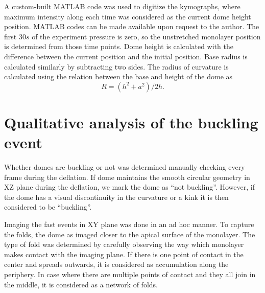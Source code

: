 A custom-built MATLAB code was used to digitize the kymographs, where maximum intensity along each time was considered as the current dome height position. MATLAB codes can be made available upon request to the author. The first $30 s$ of the experiment pressure is zero, so the unstretched monolayer position is determined from those time points. Dome height is calculated with the difference between the current position and the initial position. Base radius is calculated similarly by subtracting two sides. The radius of curvature is calculated using the relation between the base and height of the dome as
$$R=(h^2+a^2)/2h.$$


\section{Qualitative analysis of the buckling event}

Whether domes are buckling or not was determined manually checking every frame during the deflation. If dome maintains the smooth circular geometry in XZ plane during the deflation, we mark the dome as “not buckling”. However, if the dome has a visual discontinuity in the curvature or a kink it is then considered to be “buckling”.

Imaging the fast events in XY plane was done in an ad hoc manner. To capture the folds, the dome as imaged closer to the apical surface of the monolayer. The type of fold was determined by carefully observing the way which monolayer makes contact with the imaging plane. If there is one point of contact in the center and spreads outwards, it is considered as accumulation along the periphery. In case where there are multiple points of contact and they all join in the middle, it is considered as a network of folds.